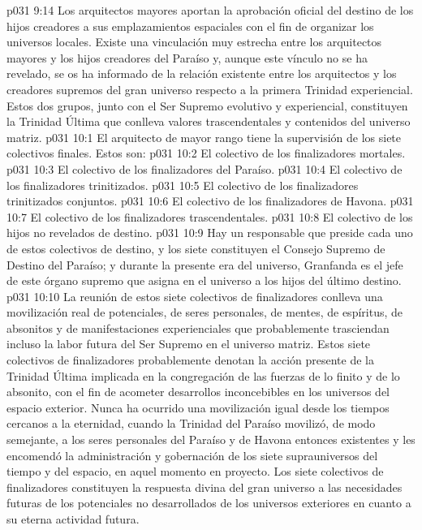 \vs p031 9:14 Los arquitectos mayores aportan la aprobación oficial del destino de los hijos creadores a sus emplazamientos espaciales con el fin de organizar los universos locales. Existe una vinculación muy estrecha entre los arquitectos mayores y los hijos creadores del Paraíso y, aunque este vínculo no se ha revelado, se os ha informado de la relación existente entre los arquitectos y los creadores supremos del gran universo respecto a la primera Trinidad experiencial. Estos dos grupos, junto con el Ser Supremo evolutivo y experiencial, constituyen la Trinidad Última que conlleva valores trascendentales y contenidos del universo matriz.
\vs p031 10:1 El arquitecto de mayor rango tiene la supervisión de los siete colectivos finales. Estos son:
\vs p031 10:2 El colectivo de los finalizadores mortales.
\vs p031 10:3 El colectivo de los finalizadores del Paraíso.
\vs p031 10:4 El colectivo de los finalizadores trinitizados.
\vs p031 10:5 El colectivo de los finalizadores trinitizados conjuntos.
\vs p031 10:6 El colectivo de los finalizadores de Havona.
\vs p031 10:7 El colectivo de los finalizadores trascendentales.
\vs p031 10:8 El colectivo de los hijos no revelados de destino.
\vs p031 10:9 Hay un responsable que preside cada uno de estos colectivos de destino, y los siete constituyen el Consejo Supremo de Destino del Paraíso; y durante la presente era del universo, Granfanda es el jefe de este órgano supremo que asigna en el universo a los hijos del último destino.
\vs p031 10:10 La reunión de estos siete colectivos de finalizadores conlleva una movilización real de potenciales, de seres personales, de mentes, de espíritus, de absonitos y de manifestaciones experienciales que probablemente trasciendan incluso la labor futura del Ser Supremo en el universo matriz. Estos siete colectivos de finalizadores probablemente denotan la acción presente de la Trinidad Última implicada en la congregación de las fuerzas de lo finito y de lo absonito, con el fin de acometer desarrollos inconcebibles en los universos del espacio exterior. Nunca ha ocurrido una movilización igual desde los tiempos cercanos a la eternidad, cuando la Trinidad del Paraíso movilizó, de modo semejante, a los seres personales del Paraíso y de Havona entonces existentes y les encomendó la administración y gobernación de los siete suprauniversos del tiempo y del espacio, en aquel momento en proyecto. Los siete colectivos de finalizadores constituyen la respuesta divina del gran universo a las necesidades futuras de los potenciales no desarrollados de los universos exteriores en cuanto a su eterna actividad futura.
